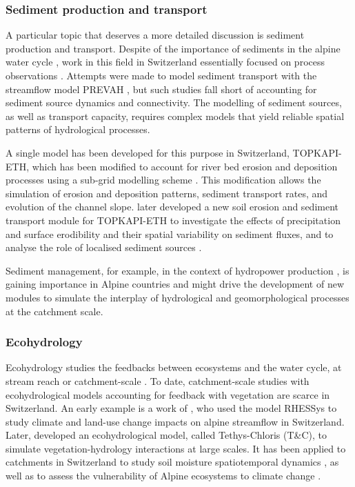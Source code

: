 \documentclass[10pt,a4paper]{article}
\begin{document}
\subsubsection{Sediment production and transport}
\label{sec:context:sediments}
A particular topic that deserves a more detailed discussion is sediment production and transport. Despite of the importance of sediments in the alpine water cycle \citep{Hegg2006}, work in this field in Switzerland essentially focused on process observations \citep{Rickenmann2012}. Attempts were made to model sediment transport with the streamflow model PREVAH \citep{RaymondPralong2015}, but such studies fall short of accounting for sediment source dynamics and connectivity. The modelling of sediment sources, as well as transport capacity, requires complex models that yield reliable spatial patterns of hydrological processes. 

A single model has been developed for this purpose in Switzerland, TOPKAPI-ETH, which has been modified to account for river bed erosion and deposition processes using a sub-grid modelling scheme \citep{Konz2011}. This modification allows the simulation of erosion and deposition patterns, sediment transport rates, and evolution of the channel slope. \citet{Battista2020a} later developed a new soil erosion and sediment transport module for TOPKAPI-ETH to investigate the effects of precipitation and surface erodibility and their spatial variability on sediment fluxes, and to analyse the role of localised sediment sources \citep{Battista2020}. 

Sediment management, for example, in the context of hydropower production \citep{RaymondPralong2015, Gabbud2016}, is gaining importance in Alpine countries and might drive the development of new modules to simulate the interplay of hydrological and geomorphological processes at the catchment scale. 


\subsubsection{Ecohydrology}
\label{sec:context:ecohydrology}

Ecohydrology studies the feedbacks between ecosystems and the water cycle, at stream reach or catchment-scale \citep{Tague2020}. To date, catchment-scale studies with ecohydrological models accounting for feedback with vegetation are scarce in Switzerland. An early example is a work of \citet{Zierl2005}, who used the model RHESSys to study climate and land-use change impacts on alpine streamflow in Switzerland. Later, \citet{Fatichi2012, Fatichi2012a} developed an ecohydrological model, called Tethys-Chloris (T\&C), to simulate vegetation-hydrology interactions at large scales. It has been applied to catchments in Switzerland to study soil moisture spatiotemporal dynamics \citep{Fatichi2015a}, as well as to assess the vulnerability of Alpine ecosystems to climate change \citep{Mastrotheodoros2019}.
\end{document}
